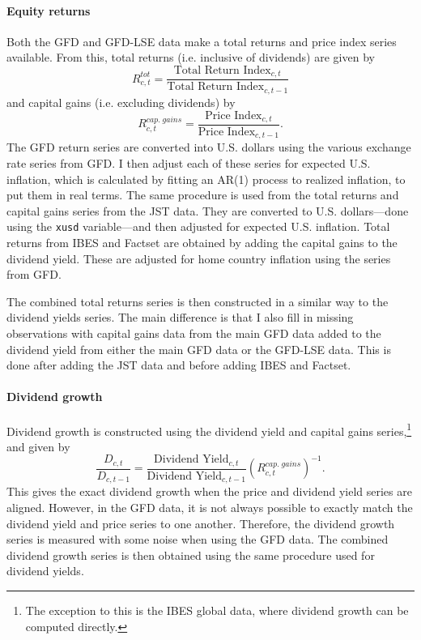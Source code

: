 \documentclass[12pt]{article}
\numberwithin{equation}{section}
\begin{document}
\paragraph{Equity returns}
Both the GFD and GFD-LSE data make a total returns and price index series available. From this, total returns (i.e. inclusive of dividends) are given by
\begin{equation*}
R^{tot}_{c,t} = \frac{\text{Total Return Index}_{c,t}}{\text{Total Return Index}_{c,t-1}}
\end{equation*}
and capital gains (i.e. excluding dividends) by
\begin{equation*}
R^{cap. \; gains}_{c,t} = \frac{\text{Price Index}_{c,t}}{\text{Price Index}_{c,t-1}}.
\end{equation*}
The GFD return series are converted into U.S. dollars using the various exchange rate series from GFD. I then adjust each of these series for expected U.S. inflation, which is calculated by fitting an AR(1) process to realized inflation, to put them in real terms. The same procedure is used from the total returns and capital gains series from the JST data. They are converted to U.S. dollars---done using the \texttt{xusd} variable---and then adjusted for expected U.S. inflation. Total returns from IBES and Factset are obtained by adding the capital gains to the dividend yield. These are adjusted for home country inflation using the series from GFD.
\label{par:convert_dollars_eq}

The combined total returns series is then constructed in a similar way to the dividend yields series.  The main difference is that I also fill in missing observations with capital gains data from the main GFD data added to the dividend yield from either the main GFD data or the GFD-LSE data. This is done after adding the JST data and before adding IBES and Factset.

\paragraph{Dividend growth}
Dividend growth is constructed using the dividend yield and capital gains series,\footnote{The exception to this is the IBES global data,  where dividend growth can be computed directly.} and given by
\begin{equation*}
\frac{D_{c,t}}{D_{c,t-1}} = \frac{\text{Dividend Yield}_{c,t}}{\text{Dividend Yield}_{c,t-1}}(R^{cap. \; gains}_{c,t})^{-1}.
\end{equation*}
This gives the exact dividend growth when the price and dividend yield series are aligned. However, in the GFD data, it is not always possible to exactly match the dividend yield and price series to one another. Therefore, the dividend growth series is measured with some noise when using the GFD data.  The combined dividend growth series is then obtained using the same procedure used for dividend yields. 
\end{document}
